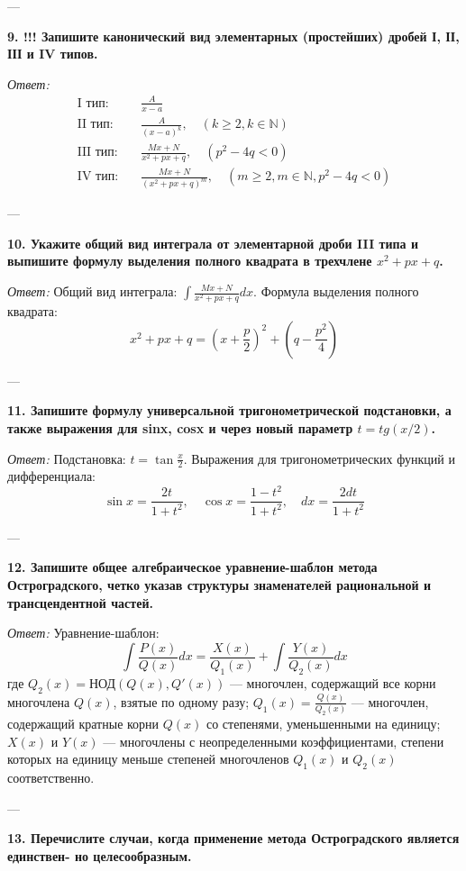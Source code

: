 \documentclass{article}
\begin{document}
---

\textbf{9. !!! Запишите канонический вид элементарных (простейших) дробей І, ІІ, ІІІ и IV типов.}

\textit{Ответ:}
\begin{align*}
\text{I тип:} & \quad \frac{A}{x-a} \\
\text{II тип:} & \quad \frac{A}{(x-a)^k}, \quad (k \ge 2, k \in \mathbb{N}) \\
\text{III тип:} & \quad \frac{Mx+N}{x^2+px+q}, \quad (p^2-4q < 0) \\
\text{IV тип:} & \quad \frac{Mx+N}{(x^2+px+q)^m}, \quad (m \ge 2, m \in \mathbb{N}, p^2-4q < 0)
\end{align*}

---

\textbf{10. Укажите общий вид интеграла от элементарной дроби III типа и выпишите формулу выделения полного квадрата в трехчлене $x^{2}+px+q$.}

\textit{Ответ:} Общий вид интеграла: $\int \frac{Mx+N}{x^2+px+q} dx$. Формула выделения полного квадрата:
$$ x^2+px+q = \left(x + \frac{p}{2}\right)^2 + \left(q - \frac{p^2}{4}\right) $$

---

\textbf{11. Запишите формулу универсальной тригонометрической подстановки, а также выражения для sinx, cosx и через новый параметр $t=tg(x/2)$.}

\textit{Ответ:} Подстановка: $t = \tan \frac{x}{2}$. Выражения для тригонометрических функций и дифференциала:
$$ \sin x = \frac{2t}{1+t^2}, \quad \cos x = \frac{1-t^2}{1+t^2}, \quad dx = \frac{2dt}{1+t^2} $$

---

\textbf{12. Запишите общее алгебраическое уравнение-шаблон метода Остроградского, четко указав структуры знаменателей рациональной и трансцендентной частей.}

\textit{Ответ:} Уравнение-шаблон:
$$ \int \frac{P(x)}{Q(x)} dx = \frac{X(x)}{Q_1(x)} + \int \frac{Y(x)}{Q_2(x)} dx $$
где $Q_2(x) = \text{НОД}(Q(x), Q'(x))$ — многочлен, содержащий все корни многочлена $Q(x)$, взятые по одному разу; $Q_1(x) = \frac{Q(x)}{Q_2(x)}$ — многочлен, содержащий кратные корни $Q(x)$ со степенями, уменьшенными на единицу; $X(x)$ и $Y(x)$ — многочлены с неопределенными коэффициентами, степени которых на единицу меньше степеней многочленов $Q_1(x)$ и $Q_2(x)$ соответственно.

---

\textbf{13. Перечислите случаи, когда применение метода Остроградского является единствен- но целесообразным.}
\end{document}

